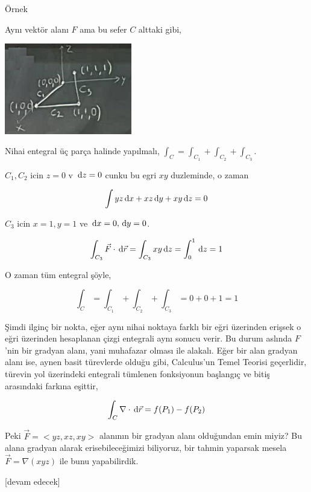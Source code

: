 \documentclass[12pt,fleqn]{article}\usepackage{../../common}
\begin{document}
Örnek

Aynı vektör alanı $F$ ama bu sefer $C$ alttaki gibi,

\includegraphics[width=15em]{calc_multi_30_01.jpg}

Nihai entegral üç parça halinde yapılmalı, $\int_C = \int_{C_1} + \int_{C_2} + \int_{C_3}$. 

$C_1,C_2$ icin $z=0$ v $\,\mathrm{d} z = 0$ cunku bu egri $xy$ duzleminde, o zaman 

$$
\int yz \,\mathrm{d} x + xz \,\mathrm{d} y + xy \,\mathrm{d} z = 0
$$

$C_3$ icin $x=1,y=1$ ve $\,\mathrm{d} x = 0, \,\mathrm{d} y = 0$. 

$$
\int_{C_3} \vec{F} \cdot \,\mathrm{d} \vec{r} =
\int_{C_3} xy \,\mathrm{d} z = \int_{0}^{1} \,\mathrm{d} z = 1
$$

O zaman tüm entegral şöyle,

$$
\int_C = \int_{C_1} + \int_{C_2} + \int_{C_3} = 0 + 0 + 1 = 1
$$

Şimdi ilginç bir nokta, eğer aynı nihai noktaya farklı bir eğri üzerinden
erişsek o eğri üzerinden hesaplanan çizgi entegrali aynı sonucu verir. Bu durum
aslında $F$'nin bir gradyan alanı, yani muhafazar olması ile alakalı. Eğer bir
alan gradyan alanı ise, aynen basit türevlerde olduğu gibi, Calculus'un Temel
Teorisi geçerlidir, türevin yol üzerindeki entegrali tümlenen fonksiyonun
başlangıç ve bitiş arasındaki farkına eşittir,

$$
\int_C \nabla \cdot \,\mathrm{d} \vec{r} = f(P_1) - f(P_2)
$$

Peki $\vec{F} = < yz, xz, xy >$ alanının bir gradyan alanı olduğundan emin
miyiz? Bu alana gradyan alarak erisebileceğimizi biliyoruz, bir tahmin
yaparsak mesela $\vec{F} = \nabla (xyz)$ ile bunu yapabilirdik.









[devam edecek]
\end{document}
